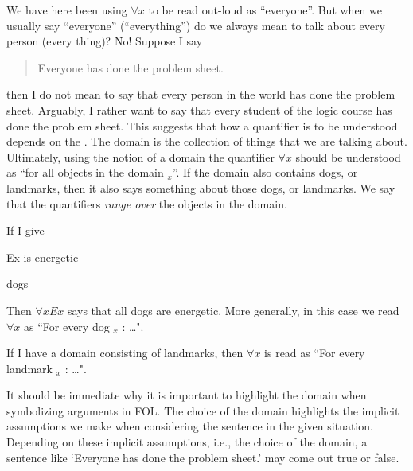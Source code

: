 We have here been using $\forall x$ to be read out-loud as ``everyone''.
But when we usually say ``everyone'' (``everything'') do we always mean to talk about every person (every thing)? No! Suppose I say
\begin{quotation}Everyone has done the problem sheet.\end{quotation}
then I do not mean to say that every person in the world has done the problem sheet. Arguably, I rather want to say that every student of the logic course has done the problem sheet. This suggests that how a quantifier is to be understood depends on the . The domain is the collection of things that we are talking about. Ultimately, using the notion of a domain the quantifier $\forall x$ should be understood as ``for all objects in the domain $_x$''. If the domain also contains dogs, or landmarks, then it also says something about those dogs, or landmarks. We say that the quantifiers \emph{range over} the objects in the domain.

If I give
\begin{ekey}
\item[Ex] is energetic
\item[\text{domain}] dogs
\end{ekey}
Then $\forall x Ex$ says that all dogs are energetic. More generally, in this case we read $\forall x$ as ``For every dog $_x$ : \ldots".

If I have a domain consisting of landmarks, then $\forall x$ is read as ``For every landmark $_x$ : \ldots".

It should be immediate why it is important to highlight the domain when symbolizing arguments in FOL. The choice of the domain highlights the implicit assumptions we make when considering the sentence in the given situation. Depending on these implicit assumptions, i.e., the choice of the domain, a sentence like `Everyone has done the problem sheet.' may come out true or false.




